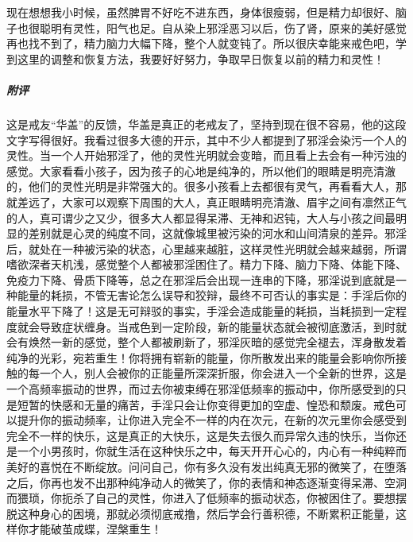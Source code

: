 \begin{case}
    现在想想我小时候，虽然脾胃不好吃不进东西，身体很瘦弱，但是精力却很好、脑子也很聪明有灵性，阳气也足。自从染上邪淫恶习以后，伤了肾，原来的美好感觉再也找不到了，精力脑力大幅下降，整个人就变钝了。所以很庆幸能来戒色吧，学到这里的调整和恢复方法，我要好好努力，争取早日恢复以前的精力和灵性！
    \subparagraph{附评} 这是戒友“华盖”的反馈，华盖是真正的老戒友了，坚持到现在很不容易，他的这段文字写得很好。我看过很多大德的开示，其中不少人都提到了邪淫会染污一个人的灵性。当一个人开始邪淫了，他的灵性光明就会变暗，而且看上去会有一种污浊的感觉。大家看看小孩子，因为孩子的心地是纯净的，所以他们的眼睛是明亮清澈的，他们的灵性光明是非常强大的。很多小孩看上去都很有灵气，再看看大人，那就差远了，大家可以观察下周围的大人，真正眼睛明亮清澈、眉宇之间有凛然正气的人，真可谓少之又少，很多大人都显得呆滞、无神和迟钝，大人与小孩之间最明显的差别就是心灵的纯度不同，这就像城里被污染的河水和山间清泉的差异。邪淫后，就处在一种被污染的状态，心里越来越脏，这样灵性光明就会越来越弱，所谓嗜欲深者天机浅，感觉整个人都被邪淫困住了。精力下降、脑力下降、体能下降、免疫力下降、骨质下降等，总之在邪淫后会出现一连串的下降，邪淫说到底就是一种能量的耗损，不管无害论怎么误导和狡辩，最终不可否认的事实是：手淫后你的能量水平下降了！这是无可辩驳的事实，手淫会造成能量的耗损，当耗损到一定程度就会导致症状缠身。当戒色到一定阶段，新的能量状态就会被彻底激活，到时就会有焕然一新的感觉，整个人都被刷新了，邪淫灰暗的感觉完全褪去，浑身散发着纯净的光彩，宛若重生！你将拥有崭新的能量，你所散发出来的能量会影响你所接触的每一个人，别人会被你的正能量所深深折服，你会进入一个全新的世界，这是一个高频率振动的世界，而过去你被束缚在邪淫低频率的振动中，你所感受到的只是短暂的快感和无量的痛苦，手淫只会让你变得更加的空虚、惶恐和颓废。戒色可以提升你的振动频率，让你进入完全不一样的内在次元，在新的次元里你会感受到完全不一样的快乐，这是真正的大快乐，这是失去很久而异常久违的快乐，当你还是一个小男孩时，你就生活在这种快乐之中，每天开开心心的，内心有一种纯粹而美好的喜悦在不断绽放。问问自己，你有多久没有发出纯真无邪的微笑了，在堕落之后，你再也发不出那种纯净动人的微笑了，你的表情和神态逐渐变得呆滞、空洞而猥琐，你扼杀了自己的灵性，你进入了低频率的振动状态，你被困住了。要想摆脱这种身心的困境，那就必须彻底戒撸，然后学会行善积德，不断累积正能量，这样你才能破茧成蝶，涅槃重生！
\end{case}

